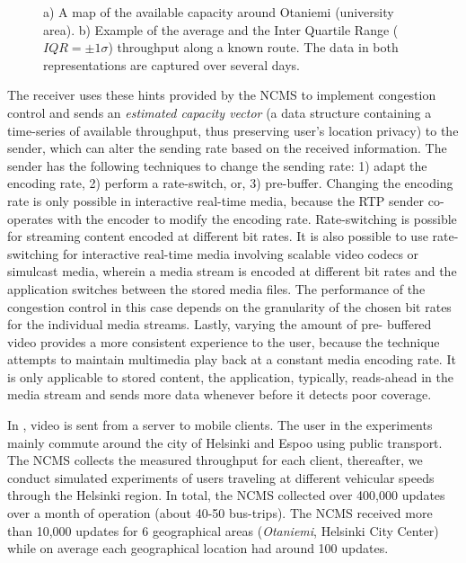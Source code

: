 \begin{figure}
  \centerline{
  }
  \centerline{
  }
  \caption{a) A map of the available capacity around Otaniemi (university
  area). b) Example of the average and the Inter Quartile Range
  ($IQR=\pm1\sigma$) throughput along a known route. The data in both
  representations are captured over several days.}
  \label{fig:glass:map}
\end{figure}

The receiver uses these hints provided by the NCMS to implement congestion
control and sends an \emph{estimated capacity vector} (a data structure
containing a time-series of available throughput, thus preserving user's
location privacy) to the sender, which can alter the sending rate based on the
received information. The sender has the following techniques to change the
sending rate: 1) adapt the encoding rate, 2) perform a rate-switch, or, 3)
pre-buffer. Changing the encoding rate is only possible in interactive 
real-time media, because the RTP sender co-operates with the encoder to  modify the
encoding rate. Rate-switching is possible for streaming content  encoded at
different bit rates. It is also possible to use rate-switching  for
interactive real-time media involving scalable video codecs or simulcast
media, wherein a media stream is encoded at different bit rates and the
application switches between the stored media files. The performance of the
congestion control in this case depends on the granularity of the chosen bit
rates for the individual media streams. Lastly, varying the amount of  pre-
buffered video provides a more consistent experience to the user,  because the
technique attempts to maintain multimedia play back at a constant  media
encoding rate. It is only applicable to stored content, the application,
typically, reads-ahead in the media stream and sends more data whenever before
it detects poor coverage.

In , video is sent from a server to mobile clients. The user
in the experiments mainly commute around the city of Helsinki and Espoo using
public transport. The NCMS collects the measured throughput for each client,
thereafter, we conduct simulated experiments of users traveling at different
vehicular speeds through the Helsinki region. In total, the NCMS collected
over 400,000 updates over a month of operation (about 40-50 bus-trips). The
NCMS received more than 10,000 updates for 6 geographical areas
(\emph{Otaniemi}, Helsinki City Center) while on average each geographical
location had around 100 updates.


